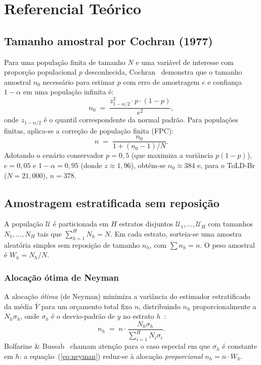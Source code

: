 \section{Referencial Teórico}
\label{sec:theory}

\subsection{Tamanho amostral por Cochran (1977)}
\label{sec:theory:cochran}

Para uma população finita de tamanho $N$ e uma variável de interesse com
proporção populacional $p$ desconhecida, Cochran~\cite{cochran1977} demonstra
que o tamanho amostral $n_0$ necessário para estimar $p$ com erro de
amostragem $e$ e confiança $1-\alpha$ em uma população infinita é:
\begin{equation}
  n_0 \;=\; \frac{z_{1-\alpha/2}^{2} \cdot p \cdot (1-p)}{e^{2}},
  \label{eq:n0}
\end{equation}
onde $z_{1-\alpha/2}$ é o quantil correspondente da normal padrão. Para
populações finitas, aplica-se a correção de população finita (FPC):
\begin{equation}
  n \;=\; \frac{n_0}{1 + (n_0 - 1)/N}.
  \label{eq:n}
\end{equation}
Adotando o cenário conservador $p=0{,}5$ (que maximiza a variância
$p(1-p)$), $e=0{,}05$ e $1-\alpha=0{,}95$ (donde $z\approx 1{,}96$),
obtém-se $n_0 \approx 384$ e, para o ToLD-Br ($N=21{,}000$), $n=378$.

\subsection{Amostragem estratificada sem reposição}
\label{sec:theory:strat}

A população $\mathcal{U}$ é particionada em $H$ estratos disjuntos
$\mathcal{U}_1, \dots, \mathcal{U}_H$ com tamanhos $N_1, \dots, N_H$ tais que
$\sum_{h=1}^{H} N_h = N$. Em cada estrato, sorteia-se uma amostra aleatória
simples sem reposição de tamanho $n_h$, com $\sum n_h = n$. O peso amostral é
$W_h = N_h / N$.

\subsubsection{Alocação ótima de Neyman}
\label{sec:theory:neyman}

A alocação \emph{ótima} (de Neyman) minimiza a variância do estimador
estratificado da média $\bar{Y}$ para um orçamento total fixo $n$,
distribuindo $n_h$ proporcionalmente a $N_h \sigma_h$, onde $\sigma_h$ é o
desvio-padrão de $y$ no estrato $h$~\cite{cochran1977}:
\begin{equation}
  n_h \;=\; n \cdot \frac{N_h \sigma_h}{\sum_{i=1}^{H} N_i \sigma_i}.
  \label{eq:neyman}
\end{equation}
Bolfarine \& Bussab~\cite{bolfarine2005} chamam atenção para o caso especial
em que $\sigma_h$ é constante em $h$: a equação~(\ref{eq:neyman}) reduz-se à
alocação \textit{proporcional} $n_h = n \cdot W_h$.

